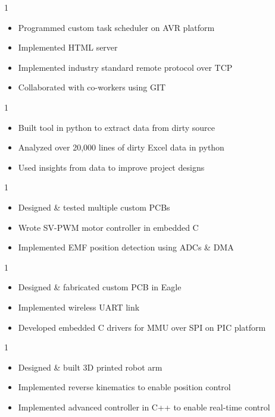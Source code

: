 \documentclass[10pt, letterpaper, ragged2e, withhyper]{AltaCV/altacv}
\def\RSEAMP{0}		%
\def\RSDATA{1}		%
\def\CSMBLDC{1}		%
\def\CSMQUAD{0}		%
\def\LSROBO{0}		%
\begin{document}
\begin{paracol}{2}
\if\RSEAMP1
\divider
{}
\begin{itemize}
\item Programmed custom task scheduler on AVR platform
\item Implemented HTML server
\item Implemented industry standard remote protocol over TCP
\item Collaborated with co-workers using GIT
\end{itemize}
\fi

\if\RSDATA1

\divider

\begin{itemize}
\item Built tool in python to extract data from dirty source
\item Analyzed over 20,000 lines of dirty Excel data in python
\item Used insights from data to improve project designs
\end{itemize}
\fi

\if\CSMBLDC1
\divider
{}
\begin{itemize}
\item Designed \& tested multiple custom PCBs
\item Wrote SV-PWM motor controller in embedded C
\item Implemented EMF position detection using ADCs \& DMA 
\end{itemize}
\fi

\if\CSMQUAD1
\divider
{}
\begin{itemize}
\item Designed \& fabricated custom PCB in Eagle
\item Implemented wireless UART link
\item Developed embedded C drivers for MMU over SPI on PIC platform
\end{itemize}
\fi


\if\LSROBO1
\divider

\begin{itemize}
\item Designed \& built 3D printed robot arm
\item Implemented reverse kinematics to enable position control
\item Implemented advanced controller in C++ to enable real-time control
\end{itemize}
\fi



\end{paracol}
\end{document}

